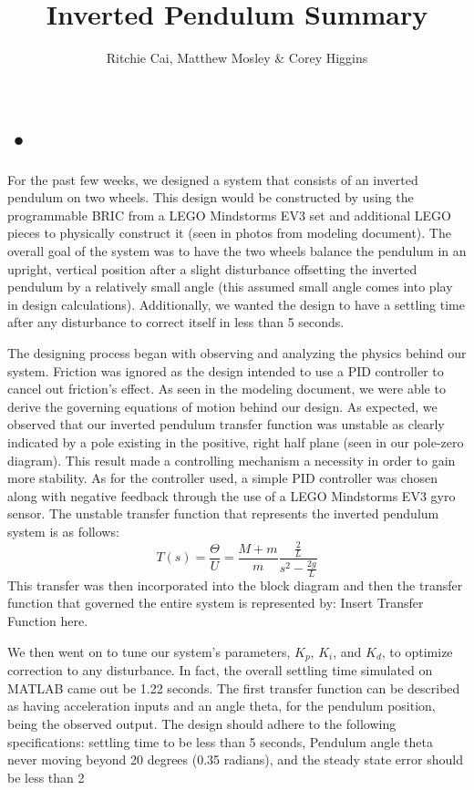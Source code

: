 \documentclass{notes}
\author{Ritchie Cai, Matthew Mosley \& Corey Higgins}
\title{Inverted Pendulum Summary}
\begin{document}
\maketitle 
\section{•}
For the past few weeks, we designed a system that consists of an inverted pendulum on two wheels. This design would be constructed by using the programmable BRIC from a LEGO Mindstorms EV3 set and additional LEGO pieces to physically construct it (seen in photos from modeling document). The overall goal of the system was to have the two wheels balance the pendulum in an upright, vertical position after a slight disturbance offsetting the inverted pendulum by a relatively small angle (this assumed small angle comes into play in design calculations). Additionally, we wanted the design to have a settling time after any disturbance to correct itself in less than 5 seconds.
   
The designing process began with observing and analyzing the physics behind our system. Friction was ignored as the design intended to use a PID controller to cancel out friction's effect. As seen in the modeling document, we were able to derive the governing equations of motion behind our design. As expected, we observed that our inverted pendulum transfer function was unstable as clearly indicated by a pole existing in the positive, right half plane (seen in our pole-zero diagram). This result made a controlling mechanism a necessity in order to gain more stability. As for the controller used, a simple PID controller was chosen along with negative feedback through the use of a LEGO Mindstorms EV3 gyro sensor. The unstable transfer function that represents the inverted pendulum system is as follows:
\[
  T(s) = \dfrac{\Theta}{U} = \dfrac{M+m}{m}\dfrac{\frac{2}{L}}{s^2-\frac{2g}{L}}
\]
This  transfer was then incorporated into the block diagram and then the transfer function that governed the entire system is represented by:
Insert Transfer Function here.

We then went on to tune our system's parameters, $K_p$, $K_i$, and $K_d$, to optimize correction to any disturbance. In fact, the overall settling time simulated on MATLAB came out be 1.22 seconds. 
The first transfer function can be described as having acceleration inputs and an angle theta, for the pendulum position, being the observed output. The design should adhere to the following specifications: settling time to be less than 5 seconds, Pendulum angle theta never moving beyond 20 degrees (0.35 radians), and the steady state error should be less than 2%
    
\end{document}
